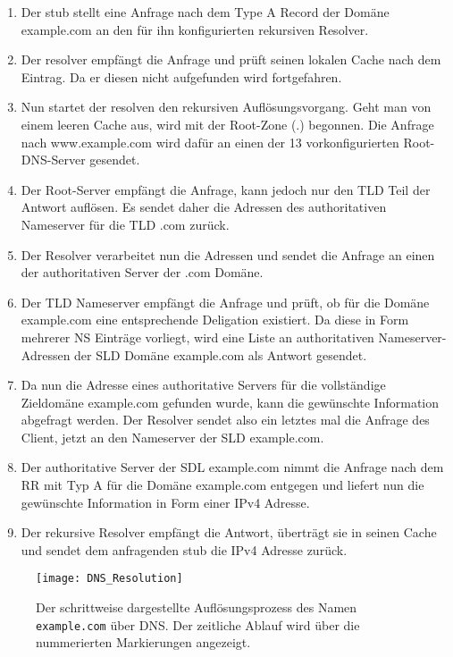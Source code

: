 \begin{enumerate}
    \item Der stub stellt eine Anfrage nach dem Type A Record der Domäne example.com an den für ihn konfigurierten rekursiven Resolver.
    \item Der resolver empfängt die Anfrage und prüft seinen lokalen Cache nach dem Eintrag. Da er diesen nicht aufgefunden wird fortgefahren.
    \item Nun startet der resolven den rekursiven Auflösungsvorgang. Geht man von einem leeren Cache aus, wird mit der Root-Zone (.) begonnen. Die Anfrage nach www.example.com wird dafür an einen der 13 vorkonfigurierten Root-DNS-Server gesendet.
    \item Der Root-Server empfängt die Anfrage, kann jedoch nur den TLD Teil der Antwort auflösen. Es sendet daher die Adressen des authoritativen Nameserver für die TLD .com zurück.
    \item Der Resolver verarbeitet nun die Adressen und sendet die Anfrage an einen der authoritativen Server der .com Domäne.
    \item Der TLD Nameserver empfängt die Anfrage und prüft, ob für die Domäne example.com eine entsprechende Deligation existiert. Da diese in Form mehrerer NS Einträge vorliegt, wird eine Liste an authoritativen Nameserver-Adressen der SLD Domäne example.com als Antwort gesendet.
    \item Da nun die Adresse eines authoritative Servers für die vollständige Zieldomäne example.com gefunden wurde, kann die gewünschte Information abgefragt werden. Der Resolver sendet also ein letztes mal die Anfrage des Client, jetzt an den Nameserver der SLD example.com.
    \item Der authoritative Server der SDL example.com nimmt die Anfrage nach dem RR mit Typ A für die Domäne example.com entgegen und liefert nun die gewünschte Information in Form einer IPv4 Adresse.
    \item Der rekursive Resolver empfängt die Antwort, überträgt sie in seinen Cache und sendet dem anfragenden stub die IPv4 Adresse zurück.
\end{enumerate}

\begin{figure}[htbp]
    \centering
    \texttt{[image: DNS\_Resolution]}
    \caption{Der schrittweise dargestellte Auflösungsprozess des Namen \texttt{example.com} über DNS. Der zeitliche Ablauf wird über die nummerierten Markierungen angezeigt.}
    \label{img:dnsresolution}
\end{figure}

